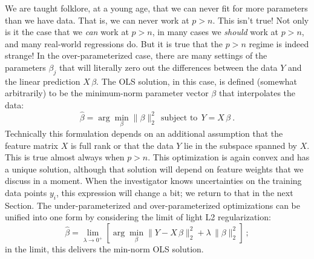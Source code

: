 \documentclass[12pt,letterpaper]{article}
\newcommand{\sectionname}{Section}
\begin{document}
We are taught folklore, at a young age, that we can never fit for more parameters than we have data. That is, we can never work at $p>n$.
This isn't true!
Not only is it the case that we \emph{can} work at $p>n$, in many cases we \emph{should} work at $p>n$, and many real-world regressions do.
But it is true that the $p>n$ regime is indeed strange!
In the over-parameterized case, there are many settings of the parameters $\beta_j$ that will literally zero out the differences between the data $Y$ and the linear prediction $X\,\beta$.
The OLS solution, in this case, is defined (somewhat arbitrarily) to be the minimum-norm parameter vector $\beta$ that interpolates the data:
\begin{equation}
    \hat{\beta} = \arg\min_\beta \|\beta\|_2^2 ~~\mbox{subject to}~~ Y = X\,\beta
    ~.
\end{equation}
Technically this formulation depends on an additional assumption that the feature matrix $X$ is full rank or that the data $Y$ lie in the subspace spanned by $X$.
This is true almost always when $p>n$.
This optimization is again convex and has a unique solution, although that solution will depend on feature weights that we discuss in a moment.
When the investigator knows uncertainties on the training data points $y_i$, this expression will change a bit; we return to that in the next \sectionname.
The under-parameterized and over-parameterized optimizations can be unified into one form by considering the limit of light L2 regularization:
\begin{equation}
    \hat{\beta} = \lim_{\lambda\rightarrow 0^+}\left[\arg\min_\beta \|Y - X\,\beta\|_2^2 + \lambda\,\|\beta\|_2^2\right]
    ~;
\end{equation}
in the limit, this delivers the min-norm OLS solution.
\end{document}
